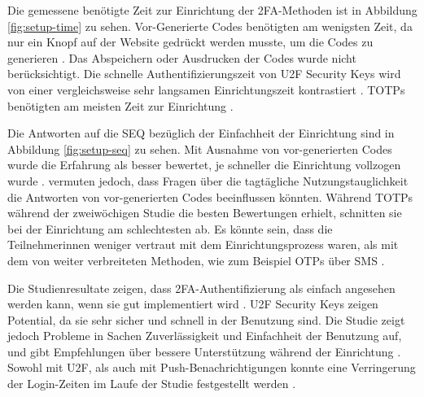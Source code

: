 Die gemessene benötigte Zeit zur Einrichtung der \ac{2FA}-Methoden ist in Abbildung \ref{fig:setup-time} zu sehen. Vor-Generierte Codes benötigten am wenigsten Zeit, da nur ein Knopf auf der Website gedrückt werden musste, um die Codes zu generieren \parencite{reeseUsabilityStudy2019}. Das Abspeichern oder Ausdrucken der Codes wurde nicht berücksichtigt. Die schnelle Authentifizierungszeit von \ac{U2F} Security Keys wird von einer vergleichsweise sehr langsamen Einrichtungszeit kontrastiert \parencite{reeseUsabilityStudy2019}. \acp{TOTP} benötigten am meisten Zeit zur Einrichtung \parencite{reeseUsabilityStudy2019}.

Die Antworten auf die \ac{SEQ} bezüglich der Einfachheit der Einrichtung sind in Abbildung \ref{fig:setup-seq} zu sehen. Mit Ausnahme von vor-generierten Codes wurde die Erfahrung als besser bewertet, je schneller die Einrichtung vollzogen wurde \parencite{reeseUsabilityStudy2019}. \textcite{reeseUsabilityStudy2019} vermuten jedoch, dass Fragen über die tagtägliche Nutzungstauglichkeit die Antworten von vor-generierten Codes beeinflussen könnten. Während \acp{TOTP} während der zweiwöchigen Studie die besten Bewertungen erhielt, schnitten sie bei der Einrichtung am schlechtesten ab. Es könnte sein, dass die Teilnehmerinnen weniger vertraut mit dem Einrichtungsprozess waren, als mit dem von weiter verbreiteten Methoden, wie zum Beispiel \acp{OTP} über SMS \parencite{reeseUsabilityStudy2019}.

\pskip
Die Studienresultate zeigen, dass \ac{2FA}-Authentifizierung als einfach angesehen werden kann, wenn sie gut implementiert wird \parencite{reeseUsabilityStudy2019}. \ac{U2F} Security Keys zeigen Potential, da sie sehr sicher und schnell in der Benutzung sind. Die Studie zeigt jedoch Probleme in Sachen Zuverlässigkeit und Einfachheit der Benutzung auf, und gibt Empfehlungen über bessere Unterstützung während der Einrichtung \parencite{reeseUsabilityStudy2019}. Sowohl mit \ac{U2F}, als auch mit Push-Benachrichtigungen konnte eine Verringerung der Login-Zeiten im Laufe der Studie festgestellt werden \parencite{reeseUsabilityStudy2019}.
